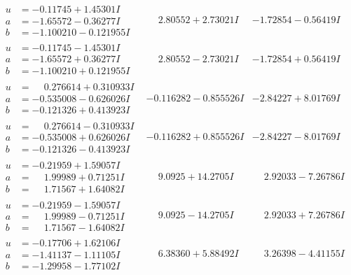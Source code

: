 \documentclass[1p]{elsarticle_modified}
\theoremstyle{definition}
\begin{document}
$$\begin{array}{c|c|c}
\begin{aligned}
u &= -0.11745 + 1.45301 I \\
a &= -1.65572 - 0.36277 I \\
b &= -1.100210 - 0.121955 I\end{aligned}
 & \phantom{-}2.80552 + 2.73021 I & -1.72854 - 0.56419 I \\ \hline\begin{aligned}
u &= -0.11745 - 1.45301 I \\
a &= -1.65572 + 0.36277 I \\
b &= -1.100210 + 0.121955 I\end{aligned}
 & \phantom{-}2.80552 - 2.73021 I & -1.72854 + 0.56419 I \\ \hline\begin{aligned}
u &= \phantom{-}0.276614 + 0.310933 I \\
a &= -0.535008 - 0.626026 I \\
b &= -0.121326 + 0.413923 I\end{aligned}
 & -0.116282 - 0.855526 I & -2.84227 + 8.01769 I \\ \hline\begin{aligned}
u &= \phantom{-}0.276614 - 0.310933 I \\
a &= -0.535008 + 0.626026 I \\
b &= -0.121326 - 0.413923 I\end{aligned}
 & -0.116282 + 0.855526 I & -2.84227 - 8.01769 I \\ \hline\begin{aligned}
u &= -0.21959 + 1.59057 I \\
a &= \phantom{-}1.99989 + 0.71251 I \\
b &= \phantom{-}1.71567 + 1.64082 I\end{aligned}
 & \phantom{-}9.0925 + 14.2705 I & \phantom{-}2.92033 - 7.26786 I \\ \hline\begin{aligned}
u &= -0.21959 - 1.59057 I \\
a &= \phantom{-}1.99989 - 0.71251 I \\
b &= \phantom{-}1.71567 - 1.64082 I\end{aligned}
 & \phantom{-}9.0925 - 14.2705 I & \phantom{-}2.92033 + 7.26786 I \\ \hline\begin{aligned}
u &= -0.17706 + 1.62106 I \\
a &= -1.41137 - 1.11105 I \\
b &= -1.29958 - 1.77102 I\end{aligned}
 & \phantom{-}6.38360 + 5.88492 I & \phantom{-}3.26398 - 4.41155 I \\ \hline\begin{aligned}

\end{aligned}
\end{array}$$
\end{document}
